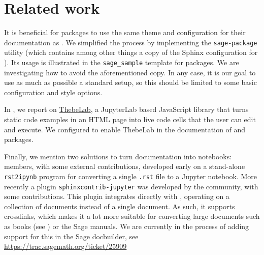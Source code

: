 \documentclass{deliverablereport}
\begin{document}
\section{Related work}

It is beneficial for \Sage packages to use the same theme
and configuration for their documentation as \Sage.
We simplified the process by implementing the \verb/sage-package/ utility
(which contains among other things a copy of the Sphinx configuration for \Sage).
Its usage is illustrated in the \verb/sage_sample/
template for \Sage packages.
We are investigating how to avoid the aforementioned copy.
In any case, it is our goal to use as much as possible a standard \Sphinx setup,
so this should be limited to some basic configuration and style options.

In , we report on
\href{https://github.com/minrk/thebelab}{ThebeLab}, a JupyterLab based
JavaScript library that turns static code examples in an HTML page
into live code cells that the user can edit and execute. We configured
\Sphinx to enable ThebeLab in the documentation of \Sage and \Sage
packages.

Finally, we mention two solutions to turn \Sphinx documentation into
\Jupyter notebooks: \ODK members, with some external contributions,
developed early on a stand-alone \verb/rst2ipynb/ program for
converting a single \verb/.rst/ file to a Jupyter notebook. More
recently a \Sphinx plugin \verb/sphinxcontrib-jupyter/ was developed
by the community, with some \ODK contributions. This plugin integrates
directly with \Sphinx, operating on a collection of documents instead
of a single document. As such, it supports crosslinks, which makes it
a lot more suitable for converting large documents such as books (see
) or the Sage manuals. We are currently
in the process of adding support for this in the Sage docbuilder, see
\url{https://trac.sagemath.org/ticket/25909}

\appendix


\end{document}
